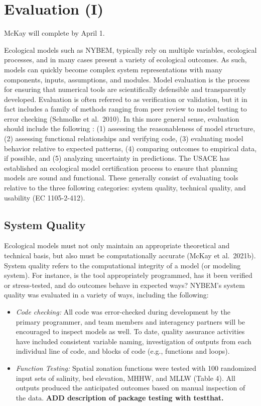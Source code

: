 \documentclass[
]{book}
\begin{document}
\hypertarget{evaluation-i}{%
\chapter{Evaluation (I)}\label{evaluation-i}}

{McKay will complete by April 1.}

Ecological models such as NYBEM, typically rely on multiple variables, ecological processes, and in many cases present a variety of ecological outcomes. As such, models can quickly become complex system representations with many components, inputs, assumptions, and modules. Model evaluation is the process for ensuring that numerical tools are scientifically defensible and transparently developed. Evaluation is often referred to as verification or validation, but it in fact includes a family of methods ranging from peer review to model testing to error checking (Schmolke et al.~2010). In this more general sense, evaluation should include the following \citep{grant_ecological_2008}: (1) assessing the reasonableness of model structure, (2) assessing functional relationships and verifying code, (3) evaluating model behavior relative to expected patterns, (4) comparing outcomes to empirical data, if possible, and (5) analyzing uncertainty in predictions. The USACE has established an ecological model certification process to ensure that planning models are sound and functional. These generally consist of evaluating tools relative to the three following categories: system quality, technical quality, and usability (EC 1105-2-412).

\hypertarget{system-quality}{%
\section{System Quality}\label{system-quality}}

Ecological models must not only maintain an appropriate theoretical and technical basis, but also must be computationally accurate (McKay et al.~2021b). System quality refers to the computational integrity of a model (or modeling system). For instance, is the tool appropriately programmed, has it been verified or stress-tested, and do outcomes behave in expected ways? NYBEM's system quality was evaluated in a variety of ways, including the following:

\begin{itemize}
\item
  \emph{Code checking:} All code was error-checked during development by the primary programmer, and team members and interagency partners will be encouraged to inspect models as well. To date, quality assurance activities have included consistent variable naming, investigation of outputs from each individual line of code, and blocks of code (e.g., functions and loops).
\item
  \emph{Function Testing:} Spatial zonation functions were tested with 100 randomized input sets of salinity, bed elevation, MHHW, and MLLW (Table 4). All outputs produced the anticipated outcomes based on manual inspection of the data. \textbf{ADD description of package testing with testthat.}
\end{itemize}
\end{document}
